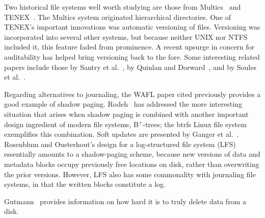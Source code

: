 Two historical file systems well worth studying are those from
Multics~\cite{max1092} and TENEX~\cite{max1032}.  The Multics system
originated hierarchical directories.  One of TENEX's important
innovations was automatic versioning of files.  Versioning was
incorporated into several other systems, but because neither UNIX nor
NTFS included it, this feature faded from prominence.  A recent
upsurge in concern for auditability has helped bring versioning back
to the fore.  Some interesting related papers include those by
Santry et al.~\cite{max1139}, by Quinlan and
Dorward~\cite{max1140}, and by Soules et al.~\cite{max1141}.

Regarding alternatives to journaling, the WAFL paper cited previously
provides a good example of shadow paging.
Rodeh~\cite{max1199} has addressed the more interesting situation that arises when shadow paging is combined
with another important design ingredient of modern file systems, B$^+$-trees;
the btrfs Linux file system exemplifies this combination.
Soft updates are presented
by Ganger et al.~\cite{max1109}.  Rosenblum and Ousterhout's
design for a log-structured file system
(LFS)~\cite{max1107} essentially amounts to a shadow-paging scheme, because
new versions of data and metadata blocks occupy previously free locations
on disk, rather than overwriting the prior versions.  However, LFS
also has some commonality with journaling file systems, in that the
written blocks constitute a log.

Gutmann~\cite{max1136} provides information on how hard it is to truly
delete data from a disk.
